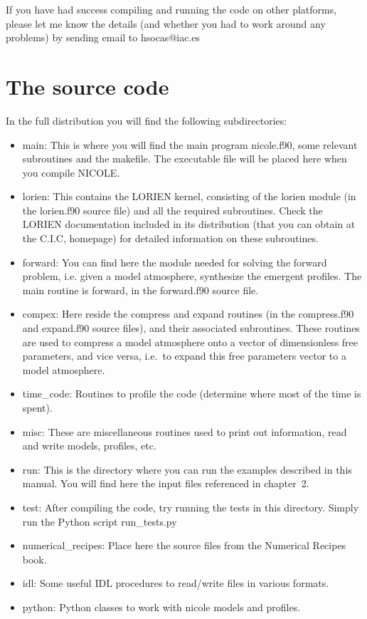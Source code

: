 If you have had success compiling and running the code on other
platforms, please let me know the details (and whether you had to work
around any problems) by sending email to hsocas@iac.es

\chapter{The source code}

In the full distribution you will find the following subdirectories: 
\begin{itemize}
\item main: This is where you will find the main program nicole.f90, 
      some relevant subroutines and the makefile. The executable 
      file will be placed here when you compile NICOLE.
\item lorien: This contains the LORIEN kernel, consisting of the 
      lorien module (in the lorien.f90 source file) and all the 
      required subroutines. Check the LORIEN documentation
      included in its distribution (that you can obtain at the 
      C.I.C, homepage) for detailed information on these subroutines.
\item forward: You can find here the module needed for solving 
      the forward problem, i.e. given a model atmosphere, 
      synthesize the emergent profiles. The main routine is forward, 
      in the forward.f90 source file. 
\item compex: Here reside the compress and expand routines 
      (in the compress.f90 and expand.f90 source files), and their 
      associated subroutines. These routines are used to
      compress a model atmosphere onto a vector of dimensionless free 
      parameters, and vice versa, i.e.\ to expand this free parameters 
      vector to a model atmosphere.
\item time\_code: Routines to profile the code (determine where most
      of the time is spent).
\item misc: These are miscellaneous routines used to print out information, 
      read and write models, profiles, etc.
\item run: This is the directory where you can run the examples described 
      in this manual.
      You will find here the input files referenced in chapter~2.
\item test: After compiling the code, try running the tests in this
  directory. Simply run the Python script run\_tests.py
\item numerical\_recipes: Place here the source files from the Numerical Recipes book.
\item idl: Some useful IDL procedures to read/write files in various formats.
\item python: Python classes to work with nicole models and profiles.
\end{itemize}

